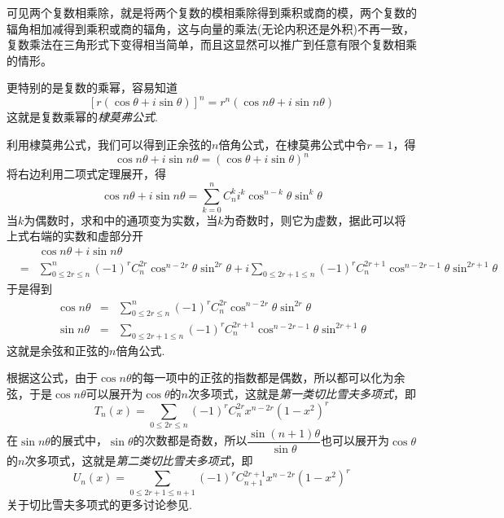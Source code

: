 可见两个复数相乘除，就是将两个复数的模相乘除得到乘积或商的模，两个复数的辐角相加减得到乘积或商的辐角，这与向量的乘法(无论内积还是外积)不再一致，复数乘法在三角形式下变得相当简单，而且这显然可以推广到任意有限个复数相乘的情形。

更特别的是复数的乘幂，容易知道
\begin{equation}
  \label{eq:de-moivre-formula}
  [r(\cos{\theta}+i\sin{\theta})]^n = r^n(\cos{n\theta}+i\sin{n\theta})
\end{equation}
这就是复数乘幂的\emph{棣莫弗公式}.

\begin{example}
  利用棣莫弗公式，我们可以得到正余弦的$n$倍角公式，在棣莫弗公式中令$r=1$，得
  \[ \cos{n\theta}+i\sin{n\theta} = (\cos{\theta}+i\sin{\theta})^n \]
  将右边利用二项式定理展开，得
  \[ \cos{n\theta}+i\sin{n\theta} = \sum_{k=0}^n C_n^k i^k \cos^{n-k}{\theta}\sin^k{\theta} \]
  当$k$为偶数时，求和中的通项变为实数，当$k$为奇数时，则它为虚数，据此可以将上式右端的实数和虚部分开
  \begin{eqnarray*}
   && \cos{n\theta}+i\sin{n\theta}  \\
    & = & \sum_{0 \leqslant 2r \leqslant n}^n (-1)^rC_n^{2r} \cos^{n-2r}{\theta}\sin^{2r}{\theta} + i\sum_{0 \leqslant 2r+1 \leqslant n}(-1)^rC_n^{2r+1} \cos^{n-2r-1}{\theta}\sin^{2r+1}{\theta} 
  \end{eqnarray*}
  于是得到
  \begin{eqnarray}
    \label{eq:cos-sin-of-n-theta}
    \cos{n\theta} & = & \sum_{0 \leqslant 2r \leqslant n}^n (-1)^rC_n^{2r} \cos^{n-2r}{\theta}\sin^{2r}{\theta} \\
    \sin{n\theta} & = & \sum_{0 \leqslant 2r+1 \leqslant n}(-1)^rC_n^{2r+1} \cos^{n-2r-1}{\theta}\sin^{2r+1}{\theta}
  \end{eqnarray}
  这就是余弦和正弦的$n$倍角公式.

  根据这公式，由于$\cos{n\theta}$的每一项中的正弦的指数都是偶数，所以都可以化为余弦，于是$\cos{n\theta}$可以展开为$\cos{\theta}$的$n$次多项式，这就是\emph{第一类切比雪夫多项式}，即
  \[ T_n(x) = \sum_{0 \leqslant 2r\leqslant n}(-1)^rC_n^{2r}x^{n-2r}(1-x^2)^r \]
  在$\sin{n\theta}$的展式中，$\sin{\theta}$的次数都是奇数，所以$\dfrac{\sin{(n+1)\theta}}{\sin{\theta}}$也可以展开为$\cos{\theta}$的$n$次多项式，这就是\emph{第二类切比雪夫多项式}，即
  \[ U_n(x)=\sum_{0 \leqslant 2r+1 \leqslant n+1}(-1)^rC_{n+1}^{2r+1}x^{n-2r}(1-x^2)^r \]
  关于切比雪夫多项式的更多讨论参见\cite{elementary-math-notes}.
\end{example}

